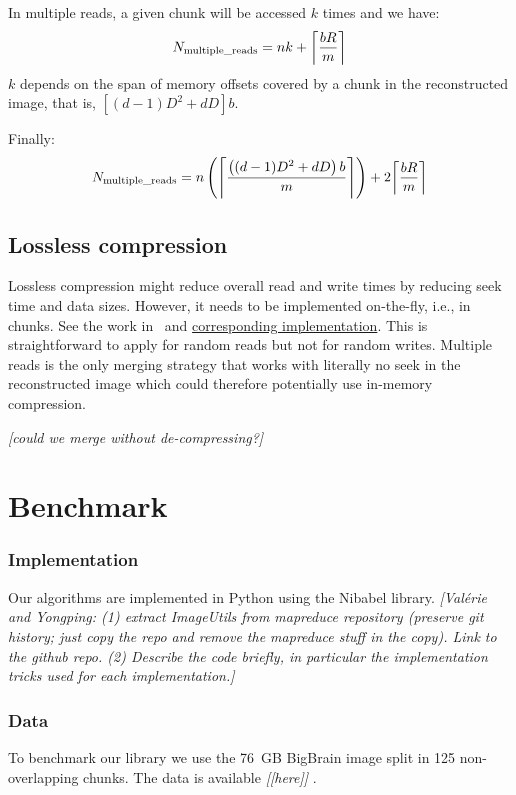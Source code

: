 \documentclass[10pt, conference, compsocconf]{IEEEtran}
\DeclarePairedDelimiter{\ceil}{\lceil}{\rceil}
\newcommand{\todo}[1]{
  \color{red}\emph{[#1]}
  \color{black}
}
\begin{document}
In multiple reads, a given chunk will be accessed $k$ times and we have: 
\begin{equation*}
   N_\mathrm{multiple\_reads}= nk + \ceil*{\frac{bR}{m}}
\end{equation*}
$k$ depends on the span of memory offsets covered by a chunk in the
reconstructed image, that is, $\left[(d-1)D^2+dD\right]b$. 

Finally:
\begin{equation}
   N_\mathrm{multiple\_reads}= n\left( \ceil*{\frac{\left((d-1)D^2+dD\right)b}{m}}\right) + 2\ceil*{\frac{bR}{m}}
\end{equation}


\subsection{Lossless compression}
     
Lossless compression might reduce overall read and write times by
reducing seek time and data sizes. However, it needs to be implemented
on-the-fly, i.e., in chunks. See the work in~\cite{rajna2015speeding}
and
\href{https://github.com/pauldmccarthy/indexed\_gzip}{corresponding
  implementation}. This is straightforward to apply for random reads
but not for random writes. Multiple reads is the only merging strategy
that works with literally no seek in the reconstructed image which
could therefore potentially use in-memory compression.

\todo{could we merge without de-compressing?}

\section{Benchmark}
\label{sec:benchmark}

\subsubsection{Implementation}

Our algorithms are implemented in Python using the Nibabel
library. \todo{Val\'erie and Yongping: (1) extract ImageUtils from
  mapreduce repository (preserve git history; just copy the repo and
  remove the mapreduce stuff in the copy). Link to the github
  repo. (2) Describe the code briefly, in particular the
  implementation tricks used for each implementation.}

\subsubsection{Data}
To benchmark our library we use the 76~GB BigBrain image split in 125
non-overlapping chunks. The data is available \todo{[here]}.
\end{document}
